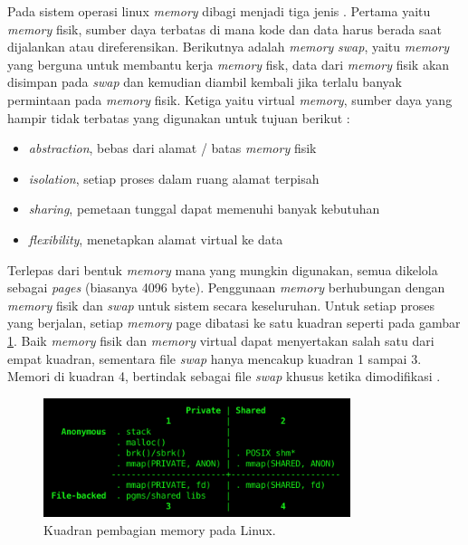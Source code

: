 Pada sistem operasi linux \textit{memory} dibagi menjadi tiga jenis . Pertama yaitu \textit{memory} fisik, sumber daya terbatas di mana kode dan data harus berada saat dijalankan atau direferensikan. Berikutnya adalah \textit{memory} \textit{swap}, yaitu  \textit{memory} yang berguna untuk membantu kerja \textit{memory} fisk, data dari \textit{memory} fisik akan disimpan pada \textit{swap} dan kemudian diambil kembali jika terlalu banyak permintaan pada \textit{memory} fisik. Ketiga yaitu virtual \textit{memory}, sumber daya yang hampir tidak terbatas yang digunakan untuk tujuan berikut :

\begin{itemize} [noitemsep, topsep=0pt]
    \item \textit{abstraction}, bebas dari alamat / batas \textit{memory} fisik 
    \item \textit{isolation}, setiap proses dalam ruang alamat terpisah 
    \item \textit{sharing}, pemetaan tunggal dapat memenuhi banyak kebutuhan 
    \item \textit{flexibility}, menetapkan alamat virtual ke data 
\end{itemize}

Terlepas dari bentuk \textit{memory} mana yang mungkin digunakan, semua dikelola sebagai \textit{pages} (biasanya 4096
byte). Penggunaan \textit{memory} berhubungan dengan \textit{memory} fisik dan \textit{swap} untuk sistem secara keseluruhan. 
Untuk setiap proses yang berjalan, setiap \textit{memory} page dibatasi ke satu kuadran seperti pada gambar \ref{fig:mem-quad}. Baik \textit{memory} fisik dan \textit{memory} virtual dapat menyertakan salah satu dari empat kuadran, sementara file \textit{swap} hanya mencakup kuadran 1 sampai 3. Memori di kuadran 4, bertindak sebagai file \textit{swap} khusus ketika dimodifikasi . 

\begin{figure}[H]
    \includegraphics[width=0.8\textwidth, center]{images/programs/memory-quadrant.png}
    \caption{Kuadran pembagian memory pada Linux.}
    \label{fig:mem-quad}
\end{figure}


